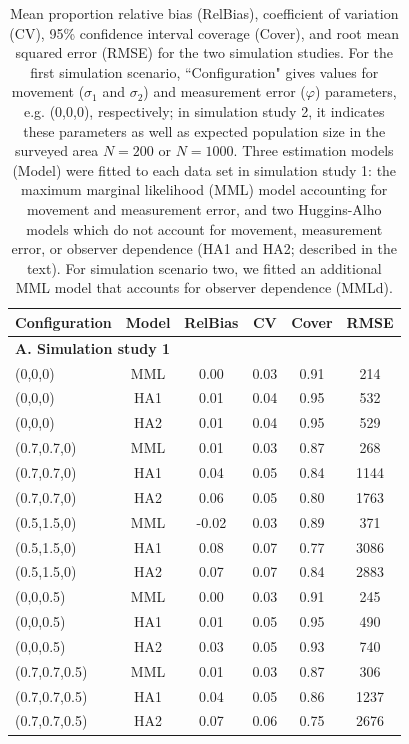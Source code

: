 \documentclass[aoas,preprint]{imsart}
\numberwithin{equation}{section}
\theoremstyle{plain}
\begin{document}
\begin{table}[ht]
\caption{Mean proportion relative bias (RelBias), coefficient of variation (CV), 95\% confidence interval coverage (Cover), and root mean squared error (RMSE) for the two simulation studies. For the first simulation scenario, ``Configuration" gives values for movement ($\sigma_1$ and $\sigma_2$) and measurement error ($\varphi$) parameters, e.g. (0,0,0), respectively; in simulation study 2, it indicates these parameters as well as expected population size in the surveyed area $N=200$ or $N=1000$.  Three estimation models (Model) were fitted to each data set in simulation study 1: the maximum marginal likelihood (MML) model accounting for movement and measurement error, and two Huggins-Alho models which do not account for movement, measurement error, or observer dependence (HA1 and HA2; described in the text).  For simulation scenario two, we fitted an additional MML model that accounts for observer dependence (MMLd).
}
\label{tab:sims}
\raggedright
\begin{tabular}{lccccc}
  \hline
   Configuration & Model & RelBias & CV & Cover & RMSE \\
  \hline
   \multicolumn{6}{l}{\textbf{A. Simulation study 1}}   \\
  \hline
  (0,0,0) & MML & 0.00 & 0.03 & 0.91 & 214 \\
  (0,0,0) & HA1 & 0.01 & 0.04 & 0.95 & 532 \\
  (0,0,0) & HA2 & 0.01 & 0.04 & 0.95 & 529 \\
  (0.7,0.7,0) & MML & 0.01 & 0.03 & 0.87 & 268 \\
  (0.7,0.7,0) & HA1 & 0.04 & 0.05 & 0.84 & 1144 \\
  (0.7,0.7,0) & HA2 & 0.06 & 0.05 & 0.80 & 1763 \\
  (0.5,1.5,0) & MML & -0.02 & 0.03 & 0.89 & 371 \\
  (0.5,1.5,0) & HA1 & 0.08 & 0.07 & 0.77 & 3086\\
  (0.5,1.5,0) & HA2 & 0.07 & 0.07 & 0.84 & 2883 \\
  (0,0,0.5) & MML & 0.00 & 0.03 & 0.91 & 245 \\
  (0,0,0.5) & HA1 & 0.01 & 0.05 & 0.95 & 490 \\
  (0,0,0.5) & HA2 & 0.03 & 0.05 & 0.93 & 740 \\
  (0.7,0.7,0.5) & MML & 0.01 & 0.03 & 0.87 & 306 \\
  (0.7,0.7,0.5) & HA1 & 0.04 & 0.05 & 0.86 & 1237 \\
  (0.7,0.7,0.5) & HA2 & 0.07 & 0.06 & 0.75 & 2676 \\

\end{tabular}
\end{table}
\end{document}
